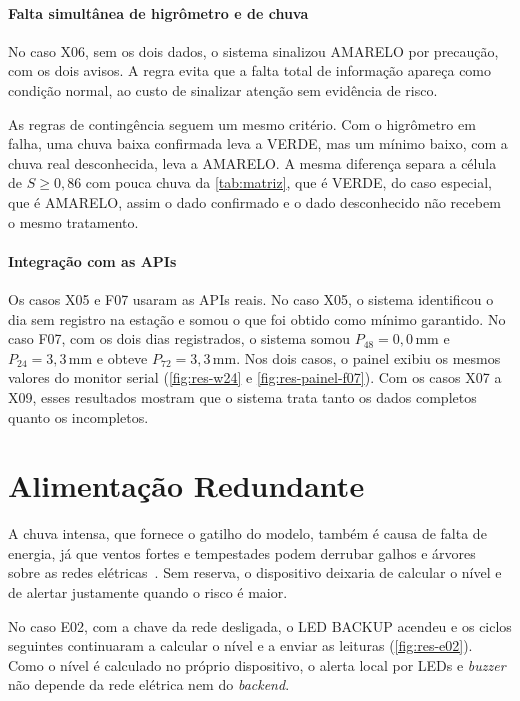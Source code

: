 \paragraph*{Falta simultânea de higrômetro e de chuva}

No caso X06, sem os dois dados, o sistema sinalizou AMARELO por
precaução, com os dois avisos. A regra evita que a falta total de
informação apareça como condição normal, ao custo de sinalizar atenção
sem evidência de risco.

As regras de contingência seguem um mesmo critério. Com o higrômetro em
falha, uma chuva baixa confirmada leva a VERDE, mas um mínimo baixo, com
a chuva real desconhecida, leva a AMARELO. A mesma diferença separa a
célula de $S \geq 0{,}86$ com pouca chuva da \autoref{tab:matriz}, que é
VERDE, do caso especial, que é AMARELO, assim o dado confirmado e o dado
desconhecido não recebem o mesmo tratamento.

\paragraph*{Integração com as APIs}

Os casos X05 e F07 usaram as APIs reais. No caso X05, o sistema
identificou o dia sem registro na estação e somou o que foi obtido como
mínimo garantido. No caso F07, com os dois dias registrados, o sistema
somou $P_{48} = 0{,}0$\,mm e $P_{24} = 3{,}3$\,mm e obteve
$P_{72} = 3{,}3$\,mm. Nos dois casos, o painel exibiu os mesmos valores
do monitor serial (\autoref{fig:res-w24} e
\autoref{fig:res-painel-f07}). Com os casos X07 a X09, esses
resultados mostram que o sistema trata tanto os dados completos quanto
os incompletos.

\section{Alimentação Redundante}
\label{sec:disc-energia}

A chuva intensa, que fornece o gatilho do modelo, também é causa de falta de energia, já que ventos fortes e tempestades podem derrubar galhos e árvores
sobre as redes elétricas~\cite[p.~10]{aneel2024nt90}. Sem reserva, o
dispositivo deixaria de calcular o nível e de alertar justamente quando o
risco é maior.

No caso E02, com a chave da rede desligada, o LED BACKUP acendeu e os
ciclos seguintes continuaram a calcular o nível e a enviar as leituras
(\autoref{fig:res-e02}). Como o nível é calculado no próprio dispositivo,
o alerta local por LEDs e \textit{buzzer} não depende da rede elétrica
nem do \textit{backend}.


